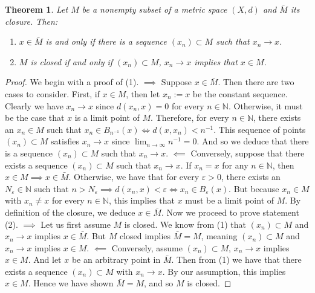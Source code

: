 \documentclass[11pt]{article}
\theoremstyle{mystyle}
\newtheorem{thm}{Theorem}[section]
\begin{document}
\begin{thm}\label{closedconvergent}
Let $M$ be a nonempty subset of a metric space $(X,d)$ and $\bar{M}$ its closure. Then:
\begin{enumerate}
    \item $x \in \bar{M}$ is and only if there is a sequence $(x_n) \subset M$ such that $x_n \longrightarrow x$.
    \item $M$ is closed if and only if $(x_n) \subset M$, $x_n \longrightarrow x$ implies that $x \in M$.
\end{enumerate}
\end{thm}
\begin{proof}
We begin with a proof of (1).\newline
$\implies$ Suppose $x \in \bar{M}$. Then there are two cases to consider. First, if $x \in M$, then let $x_n := x$ be the constant sequence. Clearly we have $x_n \longrightarrow x$ since $d(x_n, x) = 0$ for every $n \in \mathbb{N}$. Otherwise, it must be the case that $x$ is a limit point of $M$. Therefore, for every $n \in \mathbb{N}$, there exists an $x_n \in M$ such that $x_n \in B_{n^{-1}}(x) \iff d(x, x_n) < n^{-1}$. This sequence of points $(x_n) \subset M$ satisfies $x_n \longrightarrow x$ since $\lim_{n \to \infty} n^{-1} = 0$. And so we deduce that there is a sequence $(x_n) \subset M$ such that $x_n \longrightarrow x$.\newline
$\impliedby$ Conversely, suppose that there exists a sequence $(x_n) \subset M$ such that $x_n \longrightarrow x$. If $x_n = x$ for any $n \in \mathbb{N}$, then $x \in M \implies x \in \bar{M}$. Otherwise, we have that for every $\varepsilon > 0$, there exists an $N_{\varepsilon} \in \mathbb{N}$ such that $n > N_{\varepsilon} \implies d(x_n, x) <\varepsilon \iff x_n \in B_{\varepsilon}(x)$. But because $x_n \in M$ with $x_n \neq x$ for every $n \in \mathbb{N}$, this implies that $x$ must be a limit point of $M$. By definition of the closure, we deduce $x \in \bar{M}$. \newline
Now we proceed to prove statement (2).\newline
$\implies$ Let us first assume $M$ is closed. We know from (1) that $(x_n) \subset M$ and $x_n \longrightarrow x$ implies $x \in \bar{M}$. But $M$ closed implies $\bar{M} = M$, meaning $(x_n) \subset M$ and $x_n \longrightarrow x$ implies $x \in M$.\newline
$\impliedby$ Conversely, assume $(x_n) \subset M$, $x_n \longrightarrow x$ implies $x \in M$. And let $x$ be an arbitrary point in $\bar{M}$. Then from (1) we have that there exists a sequence $(x_n) \subset M$ with $x_n \longrightarrow x$. By our assumption, this implies $x \in M$. Hence we have shown $\bar{M} = M$, and so $M$ is closed.
\end{proof}
\end{document}
